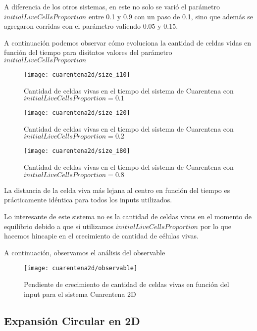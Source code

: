 A diferencia de los otros sistemas, en este no solo se varió el parámetro $initialLiveCellsProportion$ entre 0.1 y 0.9 con un paso de 0.1, 
sino que además se agregaron corridas con el parámetro valiendo 0.05 y 0.15.

A continuación podemos observar cómo evoluciona la cantidad de celdas vidas en función del tiempo para disitntos valores del parámetro $initialLiveCellsProportion$

\begin{figure}[H]
    \centering
    \texttt{[image: cuarentena2d/size\_i10]}
    \caption{Cantidad de celdas vivas en el tiempo del sistema de Cuarentena con $initialLiveCellsProportion = 0.1$}
    \label{fig:cuarentena2d_i10}
\end{figure}
\begin{figure}[H]
    \centering
    \texttt{[image: cuarentena2d/size\_i20]}
    \caption{Cantidad de celdas vivas en el tiempo del sistema de Cuarentena con $initialLiveCellsProportion = 0.2$}
    \label{fig:cuarentena2d_i20}
\end{figure}
\begin{figure}[H]
    \centering
    \texttt{[image: cuarentena2d/size\_i80]}
    \caption{Cantidad de celdas vivas en el tiempo del sistema de Cuarentena con $initialLiveCellsProportion = 0.8$}
    \label{fig:cuarentena2d_i80}
\end{figure}

La distancia de la celda viva más lejana al centro en función del tiempo es prácticamente idéntica para todos los inputs utilizados.

Lo interesante de este sistema no es la cantidad de celdas vivas en el momento de equilibrio debido a que si utilizamos $initialLiveCellsProportion$
por lo que hacemos hincapie en el crecimiento de cantidad de células vivas.

A continuación, observamos el análisis del observable

\begin{figure}[H]
    \centering
    \texttt{[image: cuarentena2d/observable]}
    \caption{Pendiente de crecimiento de cantidad de celdas vivas en función del input para el sistema Cuarentena 2D}
    \label{fig:cuarentena2d_observable}
\end{figure}


\subsection{Expansión Circular en 2D}\label{subsec:expansion-circular-2D}

